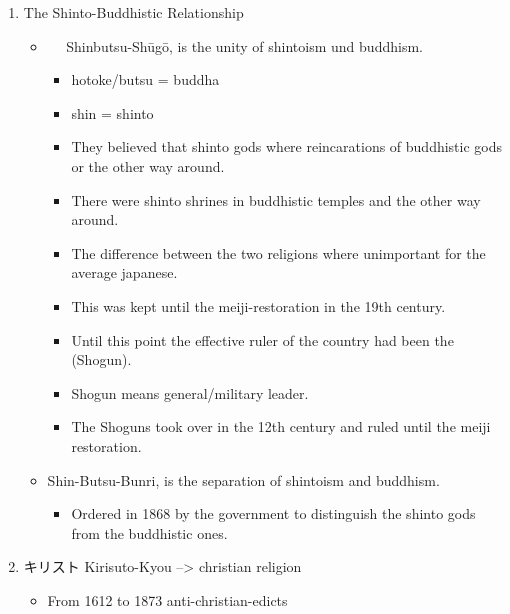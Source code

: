 \documentclass{article}
\newcommand\tabni[1][0.2cm]{\hspace*{#1}}
\begin{document}
\begin{enumerate}
\item The Shinto-Buddhistic Relationship
\begin{itemize}%
\item　 \tabni Shinbutsu-Shūgō, is the unity of shintoism und buddhism.
\begin{itemize}%
\item hotoke/butsu = buddha
\item shin = shinto
\item They believed that shinto gods where reincarations of buddhistic gods or the other way around.
\item There were shinto shrines in buddhistic temples and the other way around.
\item The difference between the two religions where unimportant for the average japanese.
\item This was kept until the meiji-restoration in the 19th century.
\item Until this point the effective ruler of the country had been the (Shogun).
\item Shogun means general/military leader.
\item The Shoguns took over in the 12th century and ruled until the meiji restoration.
\end{itemize}
\item {} \tabni Shin-Butsu-Bunri, is the separation of shintoism and buddhism.
\begin{itemize}
\item Ordered in 1868 by the government to distinguish the shinto gods from the buddhistic ones. \\
\end{itemize}
\end{itemize}
\item キリスト \tabni Kirisuto-Kyou --> christian religion
\begin{itemize}
\item From 1612 to 1873 anti-christian-edicts

\end{itemize}
\end{enumerate}
\end{document}
